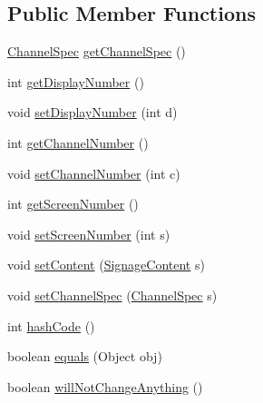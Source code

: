\subsection*{Public Member Functions}
\begin{DoxyCompactItemize}
\item 
\hyperlink{classgov_1_1fnal_1_1ppd_1_1dd_1_1xml_1_1ChannelSpec}{Channel\-Spec} \hyperlink{classgov_1_1fnal_1_1ppd_1_1dd_1_1xml_1_1ChangeChannel_a247eaef1ceb81d6f26e04672e23ad24b}{get\-Channel\-Spec} ()
\item 
int \hyperlink{classgov_1_1fnal_1_1ppd_1_1dd_1_1xml_1_1ChangeChannel_ae74f224e1801db5d540cfac8741be96a}{get\-Display\-Number} ()
\item 
void \hyperlink{classgov_1_1fnal_1_1ppd_1_1dd_1_1xml_1_1ChangeChannel_a7b182b8924d3501540912f90ec8cbab5}{set\-Display\-Number} (int d)
\item 
int \hyperlink{classgov_1_1fnal_1_1ppd_1_1dd_1_1xml_1_1ChangeChannel_a2e8a01998133f9cf606c6b26eefeea97}{get\-Channel\-Number} ()
\item 
void \hyperlink{classgov_1_1fnal_1_1ppd_1_1dd_1_1xml_1_1ChangeChannel_ad5ea7eae1008c0ce0b842d66b20671d1}{set\-Channel\-Number} (int c)
\item 
int \hyperlink{classgov_1_1fnal_1_1ppd_1_1dd_1_1xml_1_1ChangeChannel_a8c269fe008d74d65946967c6c5824e01}{get\-Screen\-Number} ()
\item 
void \hyperlink{classgov_1_1fnal_1_1ppd_1_1dd_1_1xml_1_1ChangeChannel_a7e9dbd7c522fe094bb3f85ce064a6514}{set\-Screen\-Number} (int s)
\item 
void \hyperlink{classgov_1_1fnal_1_1ppd_1_1dd_1_1xml_1_1ChangeChannel_a915498fc352efd1c7e093b965b2d58fd}{set\-Content} (\hyperlink{interfacegov_1_1fnal_1_1ppd_1_1dd_1_1signage_1_1SignageContent}{Signage\-Content} s)
\item 
void \hyperlink{classgov_1_1fnal_1_1ppd_1_1dd_1_1xml_1_1ChangeChannel_a176f8d6adf3fa672178363a540d8cb80}{set\-Channel\-Spec} (\hyperlink{classgov_1_1fnal_1_1ppd_1_1dd_1_1xml_1_1ChannelSpec}{Channel\-Spec} s)
\item 
int \hyperlink{classgov_1_1fnal_1_1ppd_1_1dd_1_1xml_1_1ChangeChannel_a96c68a10edb22329ebfe139df50339a9}{hash\-Code} ()
\item 
boolean \hyperlink{classgov_1_1fnal_1_1ppd_1_1dd_1_1xml_1_1ChangeChannel_aa610dc9476174278978e3066acc2c902}{equals} (Object obj)
\item 
boolean \hyperlink{classgov_1_1fnal_1_1ppd_1_1dd_1_1xml_1_1ChangeChannel_abd546a58c431d41849aaea4c7dd29369}{will\-Not\-Change\-Anything} ()
\end{DoxyCompactItemize}
